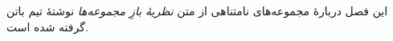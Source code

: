 \documentclass[../../../include/open-logic-chapter]{subfiles}
\begin{document}

\begin{editorial}
این فصل دربارهٔ مجموعه‌های نامتناهی از متن \emph{نظریهٔ بازِ مجموعه‌ها}
نوشتهٔ تیم باتن گرفته شده است.
\end{editorial}

\end{document}
